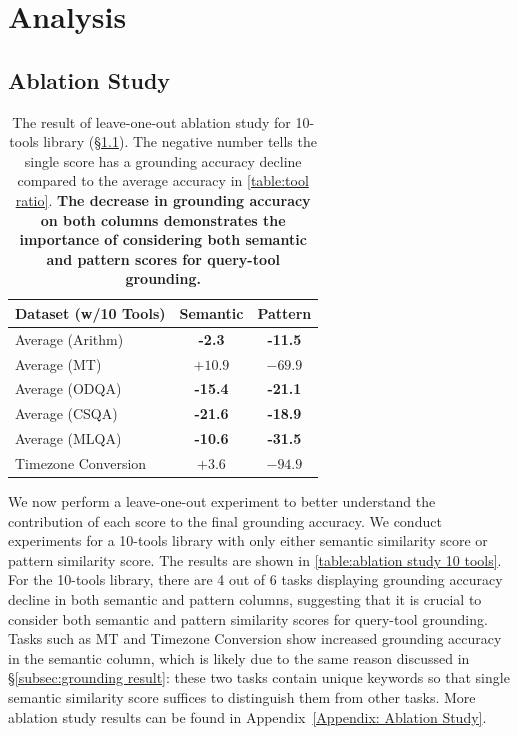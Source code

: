 \documentclass[11pt]{article}
\begin{document}
\section{Analysis}
\subsection{Ablation Study}
\label{subsec:ablation study}
\begin{table}[t]
\small
\centering
\begin{tabular*}{\linewidth}{@{\extracolsep{\fill}}lcc}
\toprule
\textbf{Dataset (w/10 Tools)}          & \textbf{Semantic} & \textbf{Pattern}  \\ \midrule
Average (Arithm)                         & \textbf{-2.3}	&\textbf{-11.5}
 \\
Average (MT)              & $+10.9$ &	$-69.9$
 \\
Average (ODQA)                   & \textbf{-15.4}& \textbf{-21.1}
  \\
Average (CSQA)                   & \textbf{-21.6}	& \textbf{-18.9} \\
Average (MLQA)                   & \textbf{-10.6}	& \textbf{-31.5} \\
Timezone Conversion              & $+3.6$	& $-94.9$
 \\ \bottomrule
\end{tabular*}
\caption{The result of leave-one-out ablation study for 10-tools library (\S\ref{subsec:ablation study}). The negative number tells the single score has a grounding accuracy decline compared to the average accuracy in \autoref{table:tool ratio}. \textbf{The decrease in grounding accuracy on both columns demonstrates the importance of considering both semantic and pattern scores for query-tool grounding.}}
\label{table:ablation study 10 tools}
\end{table}

We now perform a leave-one-out experiment to better understand the contribution of each score to the final grounding accuracy. We conduct experiments for a 10-tools library with only either semantic similarity score or pattern similarity score. The results are shown in \autoref{table:ablation study 10 tools}. For the 10-tools library, there are 4 out of 6 tasks displaying grounding accuracy decline in both semantic and pattern columns, suggesting that it is crucial to consider both semantic and pattern similarity scores for query-tool grounding. Tasks such as MT and Timezone Conversion show increased grounding accuracy in the semantic column, which is likely due to the same reason discussed in \S\ref{subsec:grounding result}: these two tasks contain unique keywords so that single semantic similarity score suffices to distinguish them from other tasks. More ablation study results can be found in Appendix~\ref{Appendix: Ablation Study}.
\end{document}
